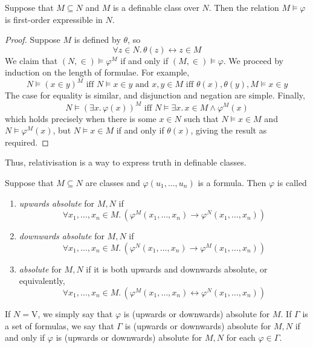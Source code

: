 \begin{proposition}
    Suppose that \( M \subseteq N \) and \( M \) is a definable class over \( N \).
    Then the relation \( M \vDash \varphi \) is first-order expressible in \( N \).
\end{proposition}
\begin{proof}
    Suppose \( M \) is defined by \( \theta \), so
    \[ \forall z \in N.\, \theta(z) \leftrightarrow z \in M \]
    We claim that \( (N, \in) \vDash \varphi^M \) if and only if \( (M, \in) \vDash \varphi \).
    We proceed by induction on the length of formulae.
    For example,
    \[ N \vDash (x \in y)^M \text{ iff } N \vDash x \in y \text{ and } x, y \in M \text{ iff } \theta(x), \theta(y), M \vDash x \in y \]
    The case for equality is similar, and disjunction and negation are simple.
    Finally,
    \[ N \vDash (\exists x.\, \varphi(x))^M \text{ iff } N \vDash \exists x.\, x \in M \wedge \varphi^M(x) \]
    which holds precisely when there is some \( x \in N \) such that \( N \vDash x \in M \) and \( N \vDash \varphi^M(x) \), but \( N \vDash x \in M \) if and only if \( \theta(x) \), giving the result as required.
\end{proof}
Thus, relativisation is a way to express truth in definable classes.
\begin{definition}
    Suppose that \( M \subseteq N \) are classes and \( \varphi(u_1, \dots, u_n) \) is a formula.
    Then \( \varphi \) is called
    \begin{enumerate}
        \item \emph{upwards absolute} for \( M, N \) if
        \[ \forall x_1, \dots, x_n \in M.\, (\varphi^M(x_1, \dots, x_n) \to \varphi^N(x_1, \dots, x_n)) \]
        \item \emph{downwards absolute} for \( M, N \) if
        \[ \forall x_1, \dots, x_n \in M.\, (\varphi^N(x_1, \dots, x_n) \to \varphi^M(x_1, \dots, x_n)) \]
        \item \emph{absolute} for \( M, N \) if it is both upwards and downwards absolute, or equivalently,
        \[ \forall x_1, \dots, x_n \in M.\, (\varphi^M(x_1, \dots, x_n) \leftrightarrow \varphi^N(x_1, \dots, x_n)) \]
    \end{enumerate}
\end{definition}
If \( N = \mathrm{V} \), we simply say that \( \varphi \) is (upwards or downwards) absolute for \( M \).
If \( \Gamma \) is a set of formulas, we say that \( \Gamma \) is (upwards or downwards) absolute for \( M, N \) if and only if \( \varphi \) is (upwards or downwards) absolute for \( M, N \) for each \( \varphi \in \Gamma \).
